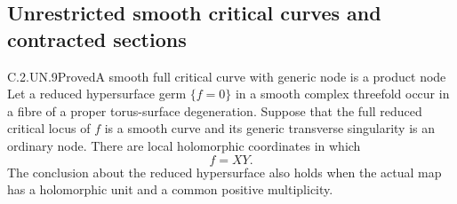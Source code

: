 \subsection{Unrestricted smooth critical curves and contracted sections}

\begin{statement}{C.2.UN.9}{Proved}{A smooth full critical curve with generic node is a product node}
Let a reduced hypersurface germ $\{f=0\}$ in a smooth
complex threefold occur in a fibre of a proper torus-surface
degeneration. Suppose that the full reduced critical locus
of $f$ is a smooth curve and its generic transverse
singularity is an ordinary node. There are local
holomorphic coordinates in which
\[
                            f=XY.                  \tag{C.UNNODE.1}
\]
The conclusion about the reduced hypersurface also holds
when the actual map has a holomorphic unit and a common
positive multiplicity.
\end{statement}

